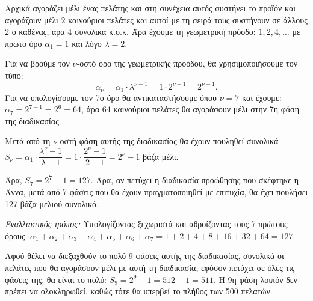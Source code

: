 
\begin{alist}
\item
\begin{rlist}
\item Αρχικά αγοράζει μέλι ένας πελάτης και στη συνέχεια αυτός συστήνει το προϊόν και αγοράζουν μέλι $2$ καινούριοι πελάτες και αυτοί με τη σειρά τους συστήνουν σε άλλους $2$ ο καθένας, άρα $4$ συνολικά κ.ο.κ.
Άρα έχουμε τη γεωμετρική πρόοδο: $1, 2, 4, \dots$ με πρώτο όρο $\alpha_1 = 1$ και λόγο $\lambda = 2$.
\item Για να βρούμε τον $\nu$-οστό όρο της γεωμετρικής προόδου, θα χρησιμοποιήσουμε τον τύπο:
\[\alpha_\nu = \alpha_1 \cdot \lambda^{\nu-1} = 1 \cdot 2^{\nu-1} = 2^{\nu-1}.\]
Για να υπολογίσουμε τον 7ο όρο θα αντικαταστήσουμε όπου $\nu = 7$ και έχουμε:
$\alpha_7 = 2^{7-1} = 2^6 = 64$, άρα $64$ καινούριοι πελάτες θα αγοράσουν μέλι στην 7η φάση της διαδικασίας.
\item Μετά από τη $\nu$-οστή φάση αυτής της διαδικασίας θα έχουν πουληθεί συνολικά
$S_\nu = \alpha_1 \cdot \dfrac{\lambda^\nu - 1}{\lambda - 1} = 1 \cdot \dfrac{2^\nu - 1}{2 - 1} = 2^\nu - 1$ βάζα μέλι.

Άρα, $S_7 = 2^7 - 1 = 127$. Άρα, αν πετύχει η διαδικασία προώθησης που σκέφτηκε η Άννα, μετά από 7 φάσεις που θα έχουν πραγματοποιηθεί με επιτυχία, θα έχει πουλήσει 127 βάζα μελιού συνολικά.

\textit{Εναλλακτικός τρόπος:} Υπολογίζοντας ξεχωριστά και αθροίζοντας τους 7 πρώτους όρους: $\alpha_1 + \alpha_2 + \alpha_3 + \alpha_4 + \alpha_5 + \alpha_6 + \alpha_7 = 1 + 2 + 4 + 8 + 16 + 32 + 64 = 127$.
\end{rlist}

\item Αφού θέλει να διεξαχθούν το πολύ 9 φάσεις αυτής της διαδικασίας, συνολικά οι πελάτες που θα αγοράσουν μέλι με αυτή τη διαδικασία, εφόσον πετύχει σε όλες τις φάσεις της, θα είναι το πολύ: $S_9 = 2^9 - 1 = 512 - 1 = 511$.
Η 9η φάση λοιπόν δεν πρέπει να ολοκληρωθεί, καθώς τότε θα υπερβεί το πλήθος των 500 πελατών.
\end{alist}

